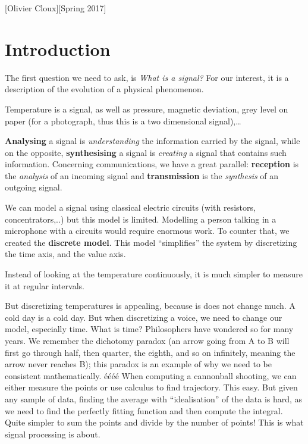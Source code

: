 \documentclass[11pt,a4paper]{article}
\numberwithin{equation}{section}
\begin{document}
[Olivier Cloux][Spring 2017]
\tableofcontents

\section{Introduction}
The first question we need to ask, is \textit{What is a signal?} For our interest, it is a description of the evolution of a physical phenomenon.
\begin{example}
    Temperature is a signal, as well as pressure, magnetic deviation, grey level on paper (for a photograph, thus this is a two dimensional signal),\ldots%
\end{example}

\textbf{Analysing} a signal is \textit{understanding} the information carried by the signal, while on the opposite, \textbf{synthesising} a signal is \textit{creating} a signal that contains such information.
Concerning communications, we have a great parallel: \textbf{reception} is the \textit{analysis} of an incoming signal and \textbf{transmission} is the \textit{synthesis} of an outgoing signal.

We can model a signal using classical electric circuits (with resistors, concentrators,..) but this model is limited. Modelling a person talking in a microphone with a circuits would require enormous work. To counter that, we created the \textbf{discrete model}. This model ``simplifies'' the system by discretizing the time axis, and the value axis. 

\begin{example}
    Instead of looking at the temperature continuously, it is much simpler to measure it at regular intervals.
\end{example}
But discretizing temperatures is appealing, because is does not change much. A cold day is a cold day. But when discretizing a voice, we need to change our model, especially time. What is time? Philosophers have wondered so for many years. We remember the dichotomy paradox (an arrow going from A to B will first go through half, then quarter, the eighth, and so on infinitely, meaning the arrow never reaches B); this paradox is an example of why we need to be consistent mathematically. 
éééé
When computing a cannonball shooting, we can either measure the points or use calculus to find trajectory. This easy. But given any sample of data, finding the average with ``idealisation'' of the data is hard, as we need to find the perfectly fitting function and then compute the integral. Quite simpler to sum the points and divide by the number of points! This is what signal processing is about.
\end{document}

